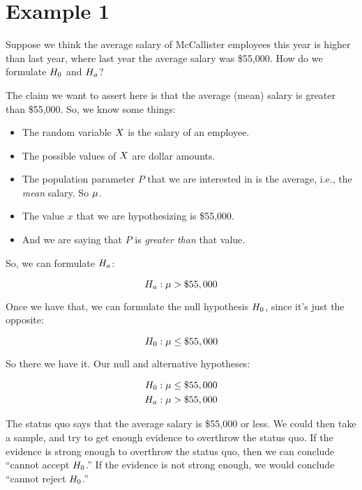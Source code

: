\documentclass[../../../main.tex]{subfiles}
\begin{document}
\section{Example 1}

Suppose we think the average salary of McCallister employees this year is higher than last year, where last year the average salary was \$55,000. How do we formulate $\NullHyp/$ and $\AltHyp/$?

The claim we want to assert here is that the average (mean) salary is greater than \$55,000. So, we know some things:

\begin{itemize}
  \item The random variable $\RandVar/$ is the salary of an employee.
  \item The possible values of $\RandVar/$ are dollar amounts.
  \item The population parameter $P$ that we are interested in is the average, i.e., the \emph{mean} salary. So $\mu$.
  \item The value $x$ that we are hypothesizing is \$55,000.
  \item And we are saying that $P$ is \emph{greater than} that value.
\end{itemize}

So, we can formulate $\AltHyp/$:

\begin{equation*}
  \AltHyp/: \populationmean > \$55,000
\end{equation*}

\noindent
Once we have that, we can formulate the null hypothesis $\NullHyp/$, since it's just the opposite:

\begin{equation*}
  \NullHyp/: \populationmean \leq \$55,000
\end{equation*}

\noindent
So there we have it. Our null and alternative hypotheses:

\begin{align*}
  \NullHyp/: \populationmean \leq \$55,000 \\
  \AltHyp/: \populationmean > \$55,000
\end{align*}

\noindent
The status quo says that the average salary is \$55,000 or less. We could then take a sample, and try to get enough evidence to overthrow the status quo. If the evidence is strong enough to overthrow the status quo, then we can conclude ``cannot accept $\NullHyp/$.'' If the evidence is not strong enough, we would conclude ``cannot reject $\NullHyp/$.''
\end{document}
